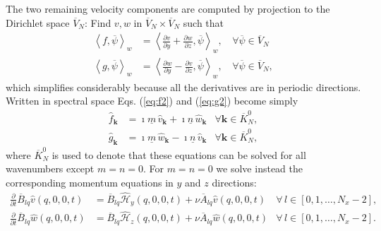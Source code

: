 \documentclass[11pt, oneside]{article}
\newcommand{\D}[1]{\overline{#1}}
\begin{document}
The two remaining velocity components are computed by projection to the 
Dirichlet space $\D{V}_N$: Find 
${v}, {w}$ in $\D{V}_N \times \D{V}_N$ such that
\begin{align}
\left<f, \D{\psi}\right>_w &= \left<\frac{\partial v}{\partial y} + 
\frac{\partial w}{\partial z}, \D{\psi}\right>_w, \, &\forall \D{\psi} \in 
\D{V}_N \label{eq:f2} \\
\left<g, \D{\psi}\right>_w &= \left<\frac{\partial w}{\partial y}  - 
\frac{\partial v}{\partial z}, \D{\psi}\right>_w, \, &\forall \D{\psi} \in 
\D{V}_N, \label{eq:g2}
\end{align}
which simplifies considerably because all the derivatives are in periodic 
directions. Written in spectral space Eqs. (\ref{eq:f2}) and (\ref{eq:g2}) 
become simply
\begin{align}
\hat{f}_{\bm{k}} &= \imath \underline{m}\, \hat{v}_{\bm{k}} + \imath 
\underline{n}\, \hat{w}_{\bm{k}} &\forall \bm{k} \in \D{K}_N^0, \label{eq:f3} \\
\hat{g}_{\bm{k}} &= \imath \underline{m}\, \hat{w}_{\bm{k}} - \imath 
\underline{n}\, \hat{v}_{\bm{k}} & \forall \bm{k} \in \D{K}_N^0, \label{eq:g3}
\end{align}
where $\D{K}_N^0$ is used to denote that these equations can be solved for all 
wavenumbers except $m=n=0$. For $m=n=0$ we solve instead the 
corresponding momentum equations in $y$ and $z$ directions:
\begin{align}
\frac{\partial }{\partial t} \D{B}_{lq}\hat{v}(q, 0, 0, t) &= 
\D{B}_{lq}\hat{\mathcal{H}}_y(q, 0, 0, t) + \nu \D{A}_{lq} \hat{v}(q, 0, 0, t) 
& \forall\, l \in [0, 1, 
\ldots, N_x-2], \label{eq:v0}\\
\frac{\partial }{\partial t} \D{B}_{lq}\hat{w}(q, 0, 0, t) &= 
\D{B}_{lq}\hat{\mathcal{H}}_z(q, 0, 0, t) + \nu \D{A}_{lq} \hat{w}(q, 0, 0, t) 
& \forall\, l \in [0, 1, \ldots, N_x-2].\label{eq:w0}
\end{align}
\end{document}
